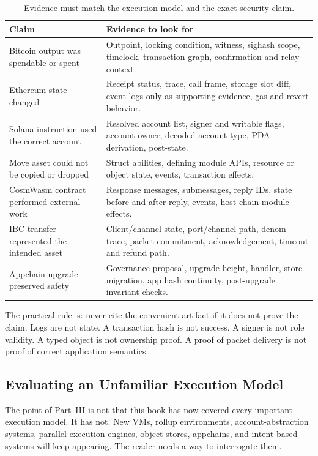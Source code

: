 \begin{table}[htbp]
\centering
\small
\renewcommand{\arraystretch}{1.18}
\begin{tabularx}{\textwidth}{@{}>{\RaggedRight\arraybackslash}p{}>{\RaggedRight\arraybackslash}X@{}}
\toprule
Claim & Evidence to look for \\
\midrule
Bitcoin output was spendable or spent & Outpoint, locking condition, witness, sighash scope, timelock, transaction graph, confirmation and relay context. \\
Ethereum state changed & Receipt status, trace, call frame, storage slot diff, event logs only as supporting evidence, gas and revert behavior. \\
Solana instruction used the correct account & Resolved account list, signer and writable flags, account owner, decoded account type, PDA derivation, post-state. \\
Move asset could not be copied or dropped & Struct abilities, defining module APIs, resource or object state, events, transaction effects. \\
CosmWasm contract performed external work & Response messages, submessages, reply IDs, state before and after reply, events, host-chain module effects. \\
IBC transfer represented the intended asset & Client/channel state, port/channel path, denom trace, packet commitment, acknowledgement, timeout and refund path. \\
Appchain upgrade preserved safety & Governance proposal, upgrade height, handler, store migration, app hash continuity, post-upgrade invariant checks. \\
\bottomrule
\end{tabularx}
\caption{Evidence must match the execution model and the exact security claim.}
\end{table}

The practical rule is: never cite the convenient artifact if it does not prove the claim. Logs are not state. A transaction hash is not success. A signer is not role validity. A typed object is not ownership proof. A proof of packet delivery is not proof of correct application semantics.

\subsection{Evaluating an Unfamiliar Execution Model}

The point of Part~III is not that this book has now covered every important execution model. It has not. New VMs, rollup environments, account-abstraction systems, parallel execution engines, object stores, appchains, and intent-based systems will keep appearing. The reader needs a way to interrogate them.

